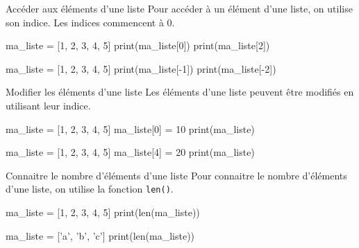 \begin{easybox}{Accéder aux éléments d'une liste}{}
	Pour accéder à un élément d'une liste, on utilise son indice. Les indices commencent à 0.

	\smallskip

	\begin{minipage}{0.48\linewidth}
		\begin{ConsolePythontex}[TaillePolice=\normalsize, Label=false]{}
ma_liste = [1, 2, 3, 4, 5]
print(ma_liste[0]) 
print(ma_liste[2]) 
		\end{ConsolePythontex}
	\end{minipage}\hfill
	\begin{minipage}{0.48\linewidth}
		\begin{ConsolePythontex}[TaillePolice=\normalsize, Label=false]{}
ma_liste = [1, 2, 3, 4, 5]
print(ma_liste[-1]) 
print(ma_liste[-2])
		\end{ConsolePythontex}
	\end{minipage}
	\end{easybox}

	\begin{easybox}{Modifier les éléments d'une liste}{}
		Les éléments d'une liste peuvent être modifiés en utilisant leur indice.

	\begin{minipage}{0.48\linewidth}
		\begin{ConsolePythontex}[TaillePolice=\normalsize, Label=false]{}
ma_liste = [1, 2, 3, 4, 5]
ma_liste[0] = 10
print(ma_liste)
		\end{ConsolePythontex}
	\end{minipage}\hfill
	\begin{minipage}{0.48\linewidth}
		\begin{ConsolePythontex}[TaillePolice=\normalsize, Label=false]{}
ma_liste = [1, 2, 3, 4, 5]
ma_liste[4] = 20
print(ma_liste)
		\end{ConsolePythontex}
	\end{minipage}
\end{easybox}

\begin{easybox}{Connaitre le nombre d'éléments d'une liste}{}
	Pour connaitre le nombre d'éléments d'une liste, on utilise la fonction \verb|len()|.

	\begin{minipage}{0.48\linewidth}
		\begin{ConsolePythontex}[TaillePolice=\normalsize, Label=false]{}
ma_liste = [1, 2, 3, 4, 5]
print(len(ma_liste))
		\end{ConsolePythontex}
	\end{minipage}\hfill
	\begin{minipage}{0.48\linewidth}
		\begin{ConsolePythontex}[TaillePolice=\normalsize, Label=false]{}
ma_liste = ['a', 'b', 'c']
print(len(ma_liste))
		\end{ConsolePythontex}
	\end{minipage}
\end{easybox}

